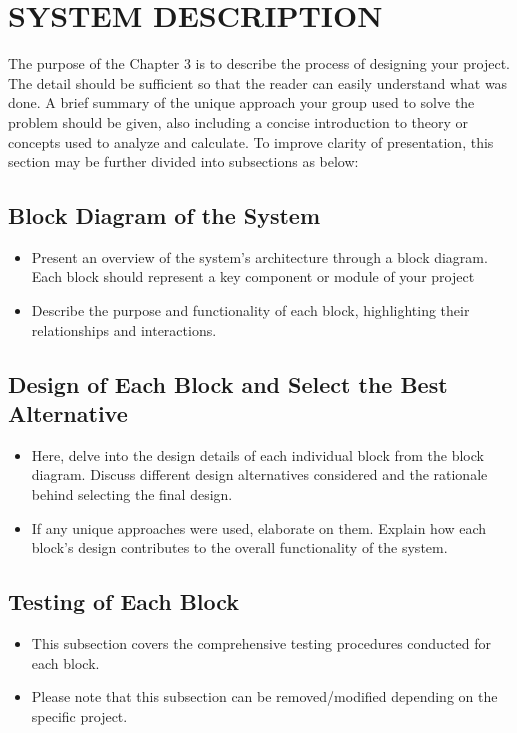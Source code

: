 \chapter{SYSTEM DESCRIPTION}
The purpose of the Chapter 3 is to describe the process of designing your project. The detail should be sufficient so that the reader can easily understand what was done. A brief summary of the unique approach your group used to solve the problem should be given, also including a concise introduction to theory or concepts used to analyze and calculate. To improve clarity of presentation, this section may be further divided into subsections as below:

\section{Block Diagram of the System}
\begin{itemize}
\item Present an overview of the system’s architecture through a block diagram. Each block should represent a key component or module of your project
\item Describe the purpose and functionality of each block, highlighting their
relationships and interactions.
\end{itemize}

\section{Design of Each Block and Select the Best Alternative}
\begin{itemize}
\item Here, delve into the design details of each individual block from the block diagram. Discuss different design alternatives considered and the rationale behind selecting the final design.
\item If any unique approaches were used, elaborate on them. Explain how each block's design contributes to the overall functionality of the system.
\end{itemize}

\section{Testing of Each Block}
\begin{itemize}
\item This subsection covers the comprehensive testing procedures conducted for each block.
\item Please note that this subsection can be removed/modified depending on the specific project.
\end{itemize}



